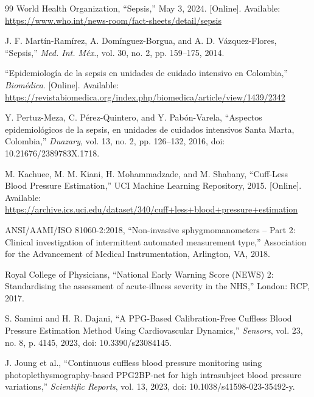 \documentclass[11pt,a4paper]{article}
\begin{document}
\begin{thebibliography}{99}
World Health Organization, ``Sepsis,'' May 3, 2024. [Online]. Available: \url{https://www.who.int/news-room/fact-sheets/detail/sepsis}

J. F. Martín-Ramírez, A. Domínguez-Borgua, and A. D. Vázquez-Flores, ``Sepsis,'' \textit{Med. Int. Méx.}, vol. 30, no. 2, pp. 159--175, 2014.

``Epidemiología de la sepsis en unidades de cuidado intensivo en Colombia,'' \textit{Biomédica}. [Online]. Available: \url{https://revistabiomedica.org/index.php/biomedica/article/view/1439/2342}

Y. Pertuz-Meza, C. Pérez-Quintero, and Y. Pabón-Varela, ``Aspectos epidemiológicos de la sepsis, en unidades de cuidados intensivos Santa Marta, Colombia,'' \textit{Duazary}, vol. 13, no. 2, pp. 126--132, 2016, doi: 10.21676/2389783X.1718.

M. Kachuee, M. M. Kiani, H. Mohammadzade, and M. Shabany, ``Cuff-Less Blood Pressure Estimation,'' UCI Machine Learning Repository, 2015. [Online]. Available: \url{https://archive.ics.uci.edu/dataset/340/cuff+less+blood+pressure+estimation}

ANSI/AAMI/ISO 81060-2:2018, ``Non-invasive sphygmomanometers -- Part 2: Clinical investigation of intermittent automated measurement type,'' Association for the Advancement of Medical Instrumentation, Arlington, VA, 2018.

Royal College of Physicians, ``National Early Warning Score (NEWS) 2: Standardising the assessment of acute-illness severity in the NHS,'' London: RCP, 2017.

S. Samimi and H. R. Dajani, ``A PPG-Based Calibration-Free Cuffless Blood Pressure Estimation Method Using Cardiovascular Dynamics,'' \textit{Sensors}, vol. 23, no. 8, p. 4145, 2023, doi: 10.3390/s23084145.

J. Joung et al., ``Continuous cuffless blood pressure monitoring using photoplethysmography-based PPG2BP-net for high intrasubject blood pressure variations,'' \textit{Scientific Reports}, vol. 13, 2023, doi: 10.1038/s41598-023-35492-y.

\end{thebibliography}
\end{document}
